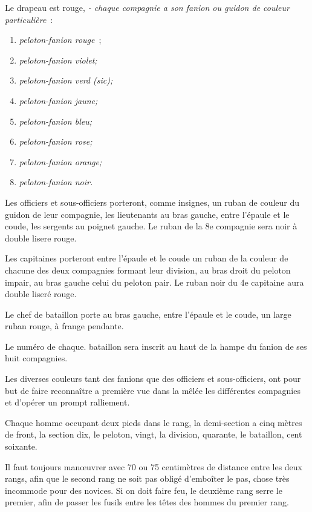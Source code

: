 \documentclass[french,twoside]{book} %
\begin{document}
\noindent Le drapeau est rouge, \emph{- chaque compagnie a son fanion ou guidon de couleur particulière} :\par

\begin{enumerate}[itemsep=0pt,]
\item \emph{peloton-fanion rouge} ;
\item  \emph{peloton-fanion violet;} 
\item  \emph{peloton-fanion verd (\emph{sic});} 
\item  \emph{peloton-fanion jaune;} 
\item  \emph{peloton-fanion bleu;} 
\item  \emph{peloton-fanion rose;} 
\item  \emph{peloton-fanion orange;} 
\item  \emph{peloton-fanion noir.} 
\end{enumerate}

\noindent Les officiers et sous-officiers porteront, comme insignes, un ruban de couleur du guidon de leur compagnie, les lieutenants au bras gauche, entre l’épaule et le coude, les sergents au poignet gauche. Le ruban de la 8e compagnie sera noir à double lisere rouge.\par
Les capitaines porteront entre l’épaule et le coude un ruban de la couleur de chacune des deux compagnies formant leur division, au bras droit du peloton impair, au bras gauche celui du peloton pair. Le ruban noir du 4e capitaine aura double liseré rouge.\par
Le chef de bataillon porte au bras gauche, entre l’épaule et le coude, un large ruban rouge, à frange pendante.\par
Le numéro de chaque. bataillon sera inscrit au haut de la hampe du fanion de ses huit compagnies.\par
Les diverses couleurs tant des fanions que des officiers et sous-officiers, ont pour but de faire reconnaître a première vue dans la mêlée les différentes compagnies et d’opérer un prompt ralliement.\par
Chaque homme occupant deux pieds dans le rang, la demi-section a cinq mètres de front, la section dix, le peloton, vingt, la division, quarante, le bataillon, cent soixante.\par
Il faut toujours manœuvrer avec 70 ou 75 centimètres de distance entre les deux rangs, afin que le second rang ne soit pas obligé d’emboîter le pas, chose très incommode pour des novices. Si on doit faire feu, le deuxième rang serre le premier, afin de passer les fusils entre les têtes des hommes du premier rang.
\end{document}
